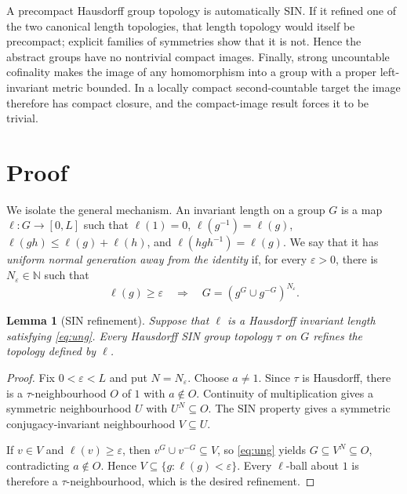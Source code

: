 \documentclass[11pt]{article}
\newtheorem{lemma}[theorem]{Lemma}
\begin{document}
A precompact Hausdorff group topology is automatically SIN.  If it refined
one of the two canonical length topologies, that length topology would itself
be precompact; explicit families of symmetries show that it is not.  Hence the
abstract groups have no nontrivial compact images.  Finally, strong
uncountable cofinality makes the image of any homomorphism into a group with a
proper left-invariant metric bounded.  In a locally compact second-countable
target the image therefore has compact closure, and the compact-image result
forces it to be trivial.

\section{Proof}

We isolate the general mechanism.  An invariant length on a group $G$ is a
map $\ell:G\to[0,L]$ such that $\ell(1)=0$, $\ell(g^{-1})=\ell(g)$,
$\ell(gh)\leq\ell(g)+\ell(h)$, and
$\ell(hgh^{-1})=\ell(g)$.  We say that it has \emph{uniform normal generation
away from the identity} if, for every $\varepsilon>0$, there is
$N_\varepsilon\in\mathbb N$ such that
\begin{equation}\label{eq:ung}
 \ell(g)\geq\varepsilon
 \quad\Longrightarrow\quad
 G=(g^G\cup g^{-G})^{N_\varepsilon}.
\end{equation}

\begin{lemma}[SIN refinement]\label{lem:refine}
Suppose that $\ell$ is a Hausdorff invariant length satisfying
\eqref{eq:ung}.  Every Hausdorff SIN group topology $\tau$ on $G$ refines the
topology defined by $\ell$.
\end{lemma}

\begin{proof}
Fix $0<\varepsilon<L$ and put $N=N_\varepsilon$.  Choose $a\neq1$.  Since
$\tau$ is Hausdorff, there is a $\tau$-neighbourhood $O$ of $1$ with
$a\notin O$.  Continuity of multiplication gives a symmetric neighbourhood
$U$ with $U^N\subseteq O$.  The SIN property gives a symmetric
conjugacy-invariant neighbourhood $V\subseteq U$.

If $v\in V$ and $\ell(v)\geq\varepsilon$, then
$v^G\cup v^{-G}\subseteq V$, so \eqref{eq:ung} yields
$G\subseteq V^N\subseteq O$, contradicting $a\notin O$.  Hence
$V\subseteq\{g:\ell(g)<\varepsilon\}$.  Every $\ell$-ball about $1$ is
therefore a $\tau$-neighbourhood, which is the desired refinement.
\end{proof}
\end{document}
